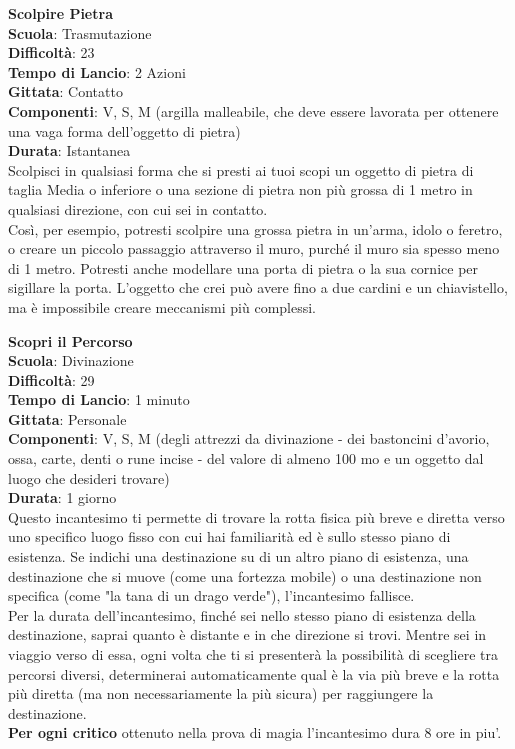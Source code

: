 \begin{multicols}{2}
\medskip\textbf{Scolpire Pietra}\\
\textbf{Scuola}: Trasmutazione\\
\textbf{Difficoltà}: 23\\
\textbf{Tempo di Lancio}: 2 Azioni\\
\textbf{Gittata}: Contatto\\
\textbf{Componenti}: V, S, M (argilla malleabile, che deve essere lavorata per ottenere una vaga forma dell'oggetto di pietra)\\
\textbf{Durata}: Istantanea\\
Scolpisci in qualsiasi forma che si presti ai tuoi scopi un oggetto di pietra di taglia Media o inferiore o una sezione di pietra non più grossa di 1 metro in qualsiasi direzione, con cui sei in contatto.\\
Così, per esempio, potresti scolpire una grossa pietra in un'arma, idolo o feretro, o creare un piccolo passaggio attraverso il muro, purché il muro sia spesso meno di 1 metro. Potresti anche modellare una porta di pietra o la sua cornice per sigillare la porta. L'oggetto che crei può avere fino a due cardini e un chiavistello, ma è impossibile creare meccanismi più complessi.

\medskip\textbf{Scopri il Percorso}\\
\textbf{Scuola}: Divinazione\\
\textbf{Difficoltà}: 29\\
\textbf{Tempo di Lancio}: 1 minuto\\
\textbf{Gittata}: Personale\\
\textbf{Componenti}: V, S, M (degli attrezzi da divinazione - dei bastoncini d'avorio, ossa, carte, denti o rune incise - del valore di almeno 100 mo e un oggetto dal luogo che desideri trovare)\\
\textbf{Durata}: 1 giorno\\
Questo incantesimo ti permette di trovare la rotta fisica più breve e diretta verso uno specifico luogo fisso con cui hai familiarità ed è sullo stesso piano di esistenza. Se indichi una destinazione su di un altro piano di esistenza, una destinazione che si muove (come una fortezza mobile) o una destinazione non specifica (come "la tana di un drago verde"), l'incantesimo fallisce.\\
Per la durata dell'incantesimo, finché sei nello stesso piano di esistenza della destinazione, saprai quanto è distante e in che direzione si trovi. Mentre sei in viaggio verso di essa, ogni volta che ti si presenterà la possibilità di scegliere tra percorsi diversi, determinerai automaticamente qual è la via più breve e la rotta più diretta (ma non necessariamente la più sicura) per raggiungere la destinazione.\\
\textbf{Per ogni critico} ottenuto nella prova di magia l'incantesimo dura 8 ore in piu'.


\end{multicols}
